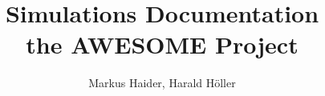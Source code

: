 \documentclass[a4paper,11pt,fleqn,oneside]{book}
\author{Markus Haider, Harald H\"oller}
\begin{document}
\title{\textbf{Simulations Documentation} \\
the AWESOME Project}
\maketitle
\tableofcontents


% 
% 

\end{document}
